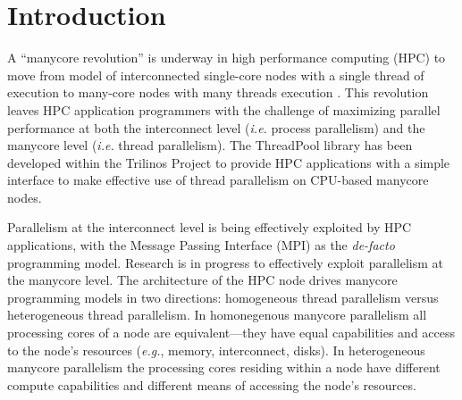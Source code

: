 \section{Introduction}

A ``manycore revolution'' is underway in high performance computing (HPC) to move from model of interconnected single-core nodes with a single thread of execution to many-core nodes with many threads execution
\cite{SciDAC:ManycoreRevolution:WebSite}.
%
This revolution leaves HPC application programmers with the challenge of maximizing parallel performance at both the interconnect level (\emph{i.e.} process parallelism) and the manycore level (\emph{i.e.} thread parallelism).
%
The ThreadPool library has been developed within the Trilinos Project
\cite{Trilinos:WebSite} to provide HPC applications with a simple interface to make effective use of thread parallelism on CPU-based manycore nodes.


Parallelism at the interconnect level is being effectively exploited by HPC applications, with the Message Passing Interface (MPI) \cite{MPI:Standard:WebSite} as the \emph{de-facto} programming model.
%
Research is in progress to effectively exploit parallelism at the manycore level.
%
The architecture of the HPC node drives manycore programming models in two directions: homogeneous thread parallelism versus heterogeneous thread parallelism.
%
In homonegenous manycore parallelism all processing cores of a node are equivalent---they have equal capabilities and access to the node's resources
(\emph{e.g.}, memory, interconnect, disks).
%
In heterogeneous manycore parallelism the processing cores residing within a node have different compute capabilities and different means of accessing the node's resources.


